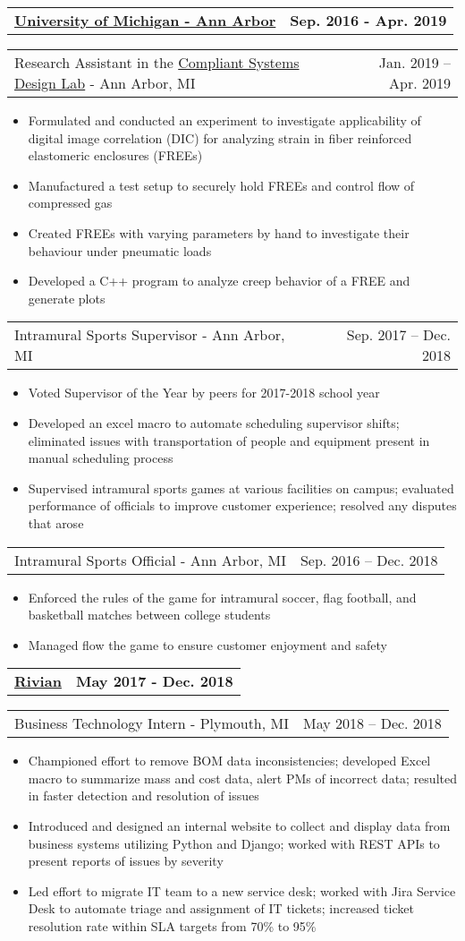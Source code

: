 \documentclass[letterpaper,11pt]{article}
\makeatletter
\newcommand{\resumeItem}[1]{
	\item\small{
		#1
	}
}
\newcommand{\resumeCompanyHeading}[2]{
  \vspace{-1pt}\item
    \begin{tabular*}{0.97\textwidth}[t]{l@{\extracolsep{\fill}}r}
      \textbf{#1} & \textbf{#2} \\
    \end{tabular*}\vspace{-0pt}
}
\newcommand{\resumeJobHeading}[3]{
	\vspace{-1pt}
	\begin{tabular*}{0.97\textwidth}[t]{l@{\extracolsep{\fill}}r}
		{\small#1} - {\small #2} & {\small #3} \\
	\end{tabular*}\vspace{-4pt}
}
\newcommand{\resumeItemListStart}{\begin{itemize}}
\newcommand{\resumeItemListEnd}{\end{itemize}\vspace{-4pt}}
\makeatother
\begin{document}
  \resumeCompanyHeading{\href{https://umich.edu/}{University of Michigan - Ann Arbor}}{Sep. 2016 - Apr. 2019}
    \resumeJobHeading{Research Assistant in the \href{http://csdl.engin.umich.edu/}{Compliant Systems Design Lab}}{Ann Arbor, MI}{Jan. 2019 -- Apr. 2019}
    \resumeItemListStart
      \resumeItem{Formulated and conducted an experiment to investigate applicability of digital image correlation (DIC) for analyzing strain in fiber reinforced elastomeric enclosures (FREEs)}
      \resumeItem{Manufactured a test setup to securely hold FREEs and control flow of compressed gas}
      \resumeItem{Created FREEs with varying parameters by hand to investigate their behaviour under pneumatic loads}
      \resumeItem{Developed a C++ program to analyze creep behavior of a FREE and generate plots}
    \resumeItemListEnd

    \resumeJobHeading{Intramural Sports Supervisor}{Ann Arbor, MI}{Sep. 2017 -- Dec. 2018}
    \resumeItemListStart
      \resumeItem{Voted Supervisor of the Year by peers for 2017-2018 school year}
      \resumeItem{Developed an excel macro to automate scheduling supervisor shifts; eliminated issues with transportation of people and equipment present in manual scheduling process}
      \resumeItem{Supervised intramural sports games at various facilities on campus; evaluated performance of officials to improve customer experience; resolved any disputes that arose}
    \resumeItemListEnd

    \resumeJobHeading{Intramural Sports Official}{Ann Arbor, MI}{Sep. 2016 -- Dec. 2018}
    \resumeItemListStart
      \resumeItem{Enforced the rules of the game for intramural soccer, flag football, and basketball matches between college students}
      \resumeItem{Managed flow the game to ensure customer enjoyment and safety}
    \resumeItemListEnd

  \resumeCompanyHeading{\href{https://rivian.com/}{Rivian}}{May 2017 - Dec. 2018}
    \resumeJobHeading{Business Technology Intern}{Plymouth, MI}{May 2018 -- Dec. 2018}
    \resumeItemListStart
      \resumeItem{Championed effort to remove BOM data inconsistencies; developed Excel macro to summarize mass and cost data, alert PMs of incorrect data; resulted in faster detection and resolution of issues}
      \resumeItem{Introduced and designed an internal website to collect and display data from business systems utilizing Python and Django; worked with REST APIs to present reports of issues by severity}
      \resumeItem{Led effort to migrate IT team to a new service desk; worked with Jira Service Desk to automate triage and assignment of IT tickets; increased ticket resolution rate within SLA targets from 70\% to 95\%}
    \resumeItemListEnd
\end{document}
